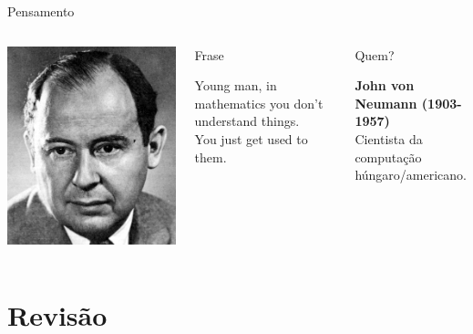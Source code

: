 \documentclass[xcolor=dvipsnames,table]{beamer}
\begin{document}
	\begin{frame}{Pensamento}
		\begin{columns}
		  		\begin{center}
		    		\includegraphics[height=.6\textheight]{images/vonNeumann.jpg}
		  		\end{center}
				\begin{block}{Frase}
					\begin{center}
						{\large Young man, in mathematics you don't understand things. \\You just get used to them.}
					\end{center}
				\end{block}		  		
		  		\begin{block}{Quem?}
		  			\begin{center}
						{\bf John von Neumann (1903-1957)} \\ Cientista da computação húngaro/americano.
					\end{center}
				\end{block}
		\end{columns}
	\end{frame}
	

\section{Revisão}
	
\end{document}
